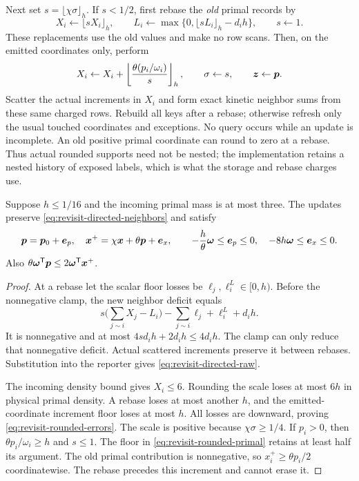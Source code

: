 Next set $s=\lfloor\chi\sigma\rfloor_h$.
If $s<1/2$, first rebase the \emph{old} primal records by
\begin{equation}
 X_i\gets\lfloor sX_i\rfloor_h,\qquad
 L_i\gets\max\{0,\lfloor sL_i\rfloor_h-d_i h\},
 \qquad s\gets1.
 \label{eq:revisit-directed-rebase}
\end{equation}
These replacements use the old values and make no row scans. Then, on
the emitted coordinates only, perform
\begin{equation}
 X_i\gets X_i+\left\lfloor\frac{\theta(p_i/\omega_i)}s\right\rfloor_h,
 \qquad \sigma\gets s,\qquad \bm{z}\gets\bm{p}.
 \label{eq:revisit-rounded-primal}
\end{equation}
Scatter the actual increments in $X_i$ and form exact kinetic neighbor
sums from these same charged rows. Rebuild all keys after a rebase;
otherwise refresh only the usual touched coordinates and exceptions.
No query occurs while an update is incomplete.
An old positive primal coordinate can round to zero at a rebase. Thus
actual rounded supports need not be nested; the implementation retains a
nested history of exposed labels, which is what the storage and rebase
charges use.

\begin{lemma}
\label{lem:revisit-rounded-records}
Suppose $h\leq1/16$ and the incoming primal mass is at most three.
The updates preserve \cref{eq:revisit-directed-neighbors} and satisfy
\begin{equation}
 \bm{p}=\bm{p}_0+\bm{e}_p,\quad
 \bm{x}^+=\chi\bm{x}+\theta\bm{p}+\bm{e}_x,\qquad
 -\frac h\theta\bm{\omega}\leq\bm{e}_p\leq0,
 \quad -8h\bm{\omega}\leq\bm{e}_x\leq0.
 \label{eq:revisit-rounded-errors}
\end{equation}
Also $\theta\bm{\omega}^{\mathsf{T}}\bm{p}\leq2\bm{\omega}^{\mathsf{T}}\bm{x}^+$.
\end{lemma}
\begin{proof}
At a rebase let the scalar floor losses be $\ell_j,\ell_i^L\in[0,h)$.
Before the nonnegative clamp, the new neighbor deficit equals
\[
 s\Big(\sum_{j\sim i}X_j-L_i\Big)
                -\sum_{j\sim i}\ell_j+\ell_i^L+d_i h.
\]
It is nonnegative and at most $4s d_i h+2d_i h\leq4d_i h$.
The clamp can only reduce that nonnegative deficit. Actual scattered
increments preserve it between rebases. Substitution into the reporter
gives \cref{eq:revisit-directed-raw}.

The incoming density bound gives $X_i\leq6$. Rounding the scale loses
at most $6h$ in physical primal density. A rebase loses at most another
$h$, and the emitted-coordinate increment floor loses at most $h$.
All losses are downward, proving \cref{eq:revisit-rounded-errors}.
The scale is positive because $\chi\sigma\geq1/4$.
If $p_i>0$, then $\theta p_i/\omega_i\geq h$ and $s\leq1$.
The floor in \cref{eq:revisit-rounded-primal} retains at least half its
argument. The old primal contribution is nonnegative, so
$x_i^+\geq\theta p_i/2$ coordinatewise. The rebase precedes this
increment and cannot erase it.
\end{proof}

